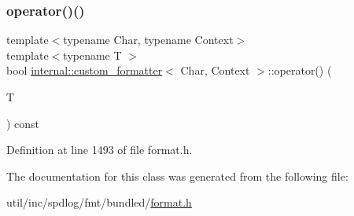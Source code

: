 \subsubsection{\texorpdfstring{operator()()}{operator()()}\hspace{0.1cm}{\footnotesize\ttfamily [2/2]}}
{\footnotesize\ttfamily template$<$typename Char, typename Context$>$ \\
template$<$typename T $>$ \\
bool \hyperlink{classinternal_1_1custom__formatter}{internal\+::custom\+\_\+formatter}$<$ Char, Context $>$\+::operator() (\begin{DoxyParamCaption}\item[{T}]{ }\end{DoxyParamCaption}) const\hspace{0.3cm}{\ttfamily [inline]}}



Definition at line 1493 of file format.\+h.



The documentation for this class was generated from the following file\+:\begin{DoxyCompactItemize}
\item 
util/inc/spdlog/fmt/bundled/\hyperlink{format_8h}{format.\+h}\end{DoxyCompactItemize}

